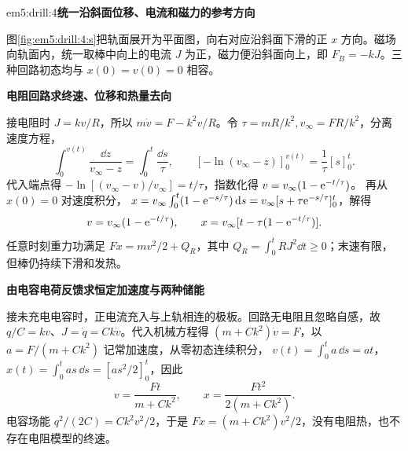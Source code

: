\begin{drillsolution}{em5:drill:4}\textbf{统一沿斜面位移、电流和磁力的参考方向}\par\nobreak
图\ref{fig:em5:drill:4:s}把轨面展开为平面图，向右对应沿斜面下滑的正 $x$ 方向。磁场向轨面内，统一取棒中向上的电流 $J$ 为正，磁力便沿斜面向上，即 $F_B=-kJ$。三种回路初态均与 $x(0)=v(0)=0$ 相容。



\par\medskip{}\noindent\textbf{电阻回路求终速、位移和热量去向}\par\nobreak
接电阻时 $J=kv/R$，所以 $m\dot v=F-k^2v/R$。令 $\tau=mR/k^2,v_\infty=FR/k^2$，分离速度方程，
\[
\int_0^{v(t)}\frac{\dd z}{v_\infty-z}=\int_0^t\frac{\dd s}{\tau},
 \qquad [-\ln(v_\infty-z)]_0^{v(t)}=\frac1\tau[s]_0^t.
\]
代入端点得 $-\ln[(v_\infty-v)/v_\infty]=t/\tau$，指数化得 $v=v_\infty(1-\mathrm e^{-t/\tau})$。
再从 $x(0)=0$ 对速度积分，
$x=v_\infty\int_0^t(1-\mathrm e^{-s/\tau})\mathop{}\!\mathrm d s
=v_\infty[s+\tau\mathrm e^{-s/\tau}]_0^t$，解得
\[v=v_\infty(1-\mathrm e^{-t/\tau}),\qquad
x=v_\infty[t-\tau(1-\mathrm e^{-t/\tau})].\]
任意时刻重力功满足 $Fx=mv^2/2+Q_R$，其中 $Q_R=\int_0^t RJ^2\dd t\ge0$；末速有限，但棒仍持续下滑和发热。




\par\medskip{}\noindent\textbf{由电容电荷反馈求恒定加速度与两种储能}\par\nobreak
接未充电电容时，正电流充入与上轨相连的极板。回路无电阻且忽略自感，故 $q/C=kv$、$J=\dot q=Ck\dot v$。代入机械方程得 $(m+Ck^2)\dot v=F$，以 $a=F/(m+Ck^2)$ 记常加速度，从零初态连续积分，
$v(t)=\int_0^t a\,\dd s=at$，
$x(t)=\int_0^t as\,\dd s=[as^2/2]_0^t$，因此
\[v=\frac{Ft}{m+Ck^2},\qquad x=\frac{Ft^2}{2(m+Ck^2)}.\]
电容场能 $q^2/(2C)=Ck^2v^2/2$，于是 $Fx=(m+Ck^2)v^2/2$，没有电阻热，也不存在电阻模型的终速。




\end{drillsolution}
